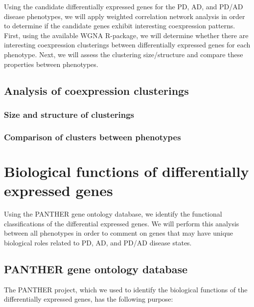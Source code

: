  Using the candidate differentially expressed genes for the PD, AD, and PD/AD disease phenotypes, we will apply weighted correlation network analysis in order to determine if the candidate genes exhibit interesting coexpression patterns. First, using the available WGNA R-package\cite{Langfelder2008}, we will determine whether there are interesting coexpression clusterings between differentially expressed genes for each phenotype. Next, we will assess the clustering size/structure and compare these properties between phenotypes.

\subsection{Analysis of coexpression clusterings}
\label{subsec:analys-coexpr-clust}

\subsubsection{Size and structure of clusterings}
\label{subsec:size-struct-clust}

\subsubsection{Comparison of clusters between phenotypes}
\label{subsec:comp-clust-betw}


\section{Biological functions of differentially expressed genes}
\label{sec:biol-funct-diff}

Using the PANTHER gene ontology database, we identify the functional classifications of the differential expressed genes. We will perform this analysis between all phenotypes in order to comment on genes that may have unique biological roles related to PD, AD, and PD/AD disease states.


\subsection{PANTHER gene ontology database}
\label{subsec:panth-gene-ontol}

The PANTHER project, which we used to identify the biological functions of the differentially expressed genes, has the following purpose\cite{PANTHER}:\\

